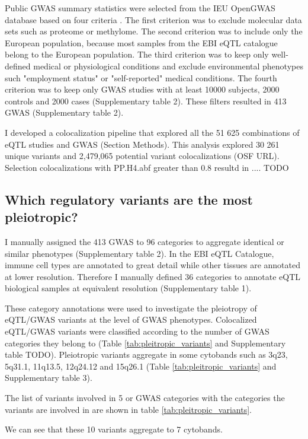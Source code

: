 Public GWAS summary statistics were selected from the IEU OpenGWAS database based on four criteria \citep{2018.Parkinson.Buniello}.
%
The first criterion was to exclude molecular data sets such as proteome or methylome.
%	
The second criterion was to include only the European population, because most samples from the EBI eQTL catalogue belong to the European population.
%
The third criterion was to keep only well-defined medical or physiological conditions and exclude environmental phenotypes such "employment status" or "self-reported" medical conditions.
%
The fourth criterion was to keep only GWAS studies with at least 10000 subjects, 2000 controls and 2000 cases (Supplementary table 2).
%
These filters resulted in 413 GWAS (Supplementary table 2).

I developed a colocalization pipeline that explored all the 51 625 combinations of eQTL studies and GWAS (Section Methods).
%
This analysis explored 30 261 unique variants and 2,479,065 potential variant colocalizations (OSF URL).
%
Selection colocalizations with PP.H4.abf greater than 0.8 resultd in .... TODO

\subsection*{Which regulatory variants are the most pleiotropic?}

I manually assigned the 413 GWAS to 96 categories to aggregate identical or similar phenotypes (Supplementary table 2).
%
In the EBI eQTL Catalogue, immune cell types are annotated to great detail while other tissues are annotated at lower resolution.
%
Therefore I manually defined 36 categories to annotate eQTL biological samples at equivalent resolution (Supplementary table 1).

These category annotations were used to investigate the pleiotropy of eQTL/GWAS variants at the level of GWAS phenotypes.
%
Colocalized eQTL/GWAS variants were classified according to the number of GWAS categories they belong to (Table \ref{tab:pleitropic_variants} and Supplementary table TODO).
%
Pleiotropic variants aggregate in some cytobands such as 3q23, 5q31.1, 11q13.5, 12q24.12 and 15q26.1 (Table \ref{tab:pleitropic_variants} and Supplementary table 3).

The list of variants involved in 5 or GWAS categories with the categories the variants are involved in are shown in table \ref{tab:pleitropic_variants}.

We can see that these 10 variants aggregate to 7 cytobands.

